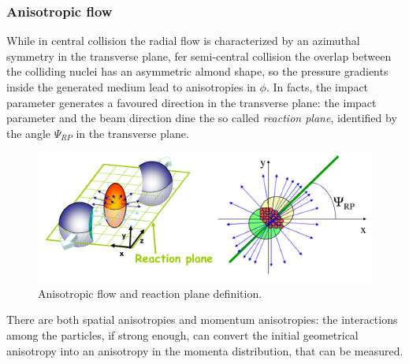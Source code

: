 \subsubsection{Anisotropic flow}
While in central collision the radial flow is characterized by an azimuthal symmetry in the transverse plane, fer semi-central collision the overlap between the colliding nuclei has an asymmetric almond shape, so the pressure gradients inside the generated medium lead to anisotropies in $\phi$. In facts, the impact parameter generates a favoured direction in the transverse plane: the impact parameter and the beam direction dine the so called \textit{reaction plane}, identified by the angle $\Psi_{RP}$ in the transverse plane.\\
%
\begin{figure}
  \centering
  \includegraphics[scale=0.3]{figures/flow.png}
  \caption{Anisotropic flow and reaction plane definition.}
  \label{fig:flow}
\end{figure}
%
There are both spatial anisotropies and momentum anisotropies: the interactions among the particles, if strong enough, can convert the initial geometrical anisotropy into an anisotropy in the momenta distribution, that can be measured.\\

